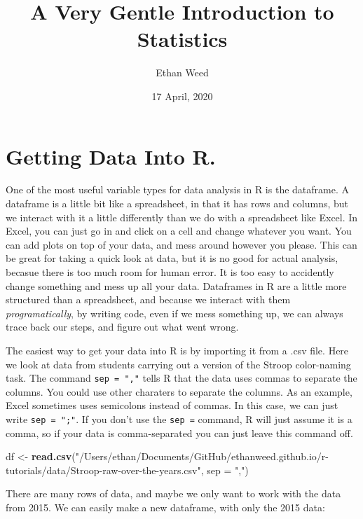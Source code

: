 \documentclass[]{article}
\title{A Very Gentle Introduction to Statistics}
\author{Ethan Weed}
\date{17 April, 2020}
\newenvironment{Shaded}{\begin{snugshade}}{\end{snugshade}}
\newcommand{\KeywordTok}[1]{\textcolor[rgb]{0.13,0.29,0.53}{\textbf{#1}}}
\newcommand{\DataTypeTok}[1]{\textcolor[rgb]{0.13,0.29,0.53}{#1}}
\newcommand{\StringTok}[1]{\textcolor[rgb]{0.31,0.60,0.02}{#1}}
\newcommand{\NormalTok}[1]{#1}
\begin{document}
\maketitle

{
\setcounter{tocdepth}{2}
\tableofcontents
}
\section{Getting Data Into R.}\label{getting-data-into-r.}

One of the most useful variable types for data analysis in R is the
dataframe. A dataframe is a little bit like a spreadsheet, in that it
has rows and columns, but we interact with it a little differently than
we do with a spreadsheet like Excel. In Excel, you can just go in and
click on a cell and change whatever you want. You can add plots on top
of your data, and mess around however you please. This can be great for
taking a quick look at data, but it is no good for actual analysis,
becasue there is too much room for human error. It is too easy to
accidently change something and mess up all your data. Dataframes in R
are a little more structured than a spreadsheet, and because we interact
with them \emph{programatically}, by writing code, even if we mess
something up, we can always trace back our steps, and figure out what
went wrong.

The easiest way to get your data into R is by importing it from a .csv
file. Here we look at data from students carrying out a version of the
Stroop color-naming task. The command \texttt{sep\ =\ ","} tells R that
the data uses commas to separate the columns. You could use other
charaters to separate the columns. As an example, Excel sometimes uses
semicolons instead of commas. In this case, we can just write
\texttt{sep\ =\ ";"}. If you don't use the \texttt{sep\ =} command, R
will just assume it is a comma, so if your data is comma-separated you
can just leave this command off.

\begin{Shaded}
\begin{Highlighting}[]
\NormalTok{df <-}\StringTok{ }\KeywordTok{read.csv}\NormalTok{(}\StringTok{"/Users/ethan/Documents/GitHub/ethanweed.github.io/r-tutorials/data/Stroop-raw-over-the-years.csv"}\NormalTok{, }\DataTypeTok{sep =} \StringTok{","}\NormalTok{)}
\end{Highlighting}
\end{Shaded}

There are many rows of data, and maybe we only want to work with the
data from 2015. We can easily make a new dataframe, with only the 2015
data:
\end{document}
